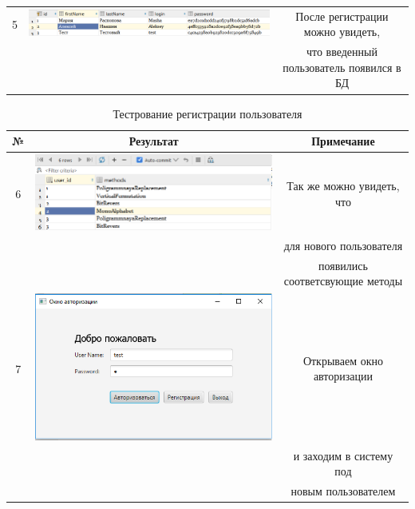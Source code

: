 \documentclass[a4paper,12pt]{article}
\begin{document}
\begin{table}[h]
\begin{tabular}{|c|c|c|}
	\hline 
	5 & \includegraphics[scale=0.3]{img/database/after_registry_user.png} & После регистрации можно увидеть, \\ && что введенный пользователь появился в БД\\
	\hline
\end{tabular} 
\label{table:data_type1} 
\end{table}

\begin{table}[pt!]
	\caption{Тестрование регистрации пользователя}
	\centering
	\begin{tabular}{|c|c|c|}
	\hline 
	№  & Результат & Примечание \\ 
	\hline 
	6 & \includegraphics[scale=0.3]{img/database/after_registry_methods.png} & Так же можно увидеть, что \\ && для нового пользователя \\ && появились соответсвующие методы\\
	\hline 
	7 & \includegraphics[scale=0.3]{img/database/authorization.png} & Открываем окно авторизации \\ && и заходим в систему под \\ && новым пользователем\\

\end{tabular}
\end{table}
\end{document}

